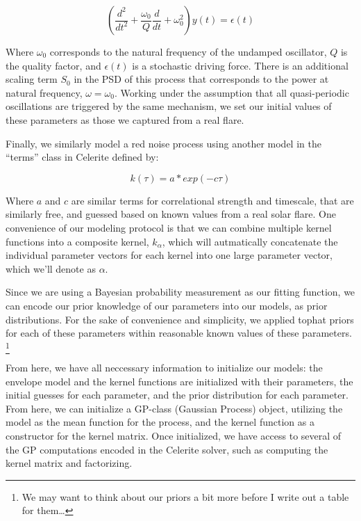 \documentclass{aastex61}
\begin{document}
\begin{equation}
	\left( \frac{d^2}{dt^2} + \frac{\omega_0}{Q} \frac{d}{dt} + \omega_0^2 \right) y(t) = \epsilon(t) 
	\label{sho}
\end{equation}

Where $\omega_0$ corresponds to the natural frequency of the undamped oscillator, $Q$ is the quality factor, and $\epsilon(t)$ is a stochastic driving force.
There is an additional scaling term $S_0$ in the PSD of this process that corresponds to the power at natural frequency, $\omega=\omega_0$.
Working under the assumption that all quasi-periodic oscillations are triggered by the same mechanism, we set our initial values of these parameters as those we captured from a real flare.

Finally, we similarly model a red noise process using another model in the ``terms'' class in Celerite defined by:

\begin{equation}
	k(\tau) = a * exp(-c\tau)
	\label{rednoise}
\end{equation}

Where $a$ and $c$ are similar terms for correlational strength and timescale, that are similarly free, and guessed based on known values from a real solar flare.
One convenience of our modeling protocol is that we can combine multiple kernel functions into a composite kernel, $k_\alpha$, which will autmatically concatenate the individual parameter vectors for each kernel into one large parameter vector, which we'll denote as $\alpha$.

Since we are using a Bayesian probability measurement as our fitting function, we can encode our prior knowledge of our parameters into our models, as prior distributions. 
For the sake of convenience and simplicity, we applied tophat priors for each of these parameters within reasonable known values of these parameters. 
\footnote{We may want to think about our priors a bit more before I write out a table for them\ldots}	


From here, we have all neccessary information to initialize our models: the envelope model and the kernel functions are initialized with their parameters, the initial guesses for each parameter, and the prior distribution for each parameter.
From here, we can initialize a GP-class (Gaussian Process) object, utilizing the model as the mean function for the process, and the kernel function as a constructor for the kernel matrix.
Once initialized, we have access to several of the GP computations encoded in the Celerite solver, such as computing the kernel matrix and factorizing.
\end{document}
